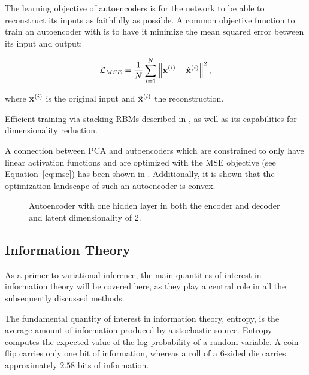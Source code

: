 The learning objective of autoencoders is for the network to be able to reconstruct its inputs as faithfully as possible. A common objective function to train an autoencoder with is to have it minimize the mean squared error between its input and output:

\begin{equation}
  \mathcal{L}_{MSE} = \frac{1}{N} \sum_{i=1}^{N} \left\lVert\mathbf{x}^{(i)} - \hat{\mathbf{x}}^{(i)}\right\rVert^2,
  \label{eq:mse}
\end{equation}

where $\mathbf{x}^{(i)}$ is the original input and $\hat{\mathbf{x}}^{(i)}$ the reconstruction.

Efficient training via stacking RBMs described in \cite{hinton_autoencoder}, as well as its capabilities for dimensionality reduction.

A connection between PCA and autoencoders which are constrained to only have linear activation functions and are optimized with the MSE objective (see Equation~\ref{eq:mse}) has been shown in \cite{autoencoder_pca}. Additionally, it is shown that the optimization landscape of such an autoencoder is convex.


\begin{figure}[!htb]
  \centering
  \resizebox{\textwidth}{!}{\unskip}
  \caption{Autoencoder with one hidden layer in both the encoder and decoder and latent dimensionality of 2.}
  \label{fig:ae}
\end{figure}

\subsection{Information Theory}

As a primer to variational inference, the main quantities of interest in information theory will be covered here, as they play a central role in all the subsequently discussed methods.

The fundamental quantity of interest in information theory, entropy, is the average amount of information produced by a stochastic source.  Entropy computes the expected value of the log-probability of a random variable. A coin flip carries only one bit of information, whereas a roll of a 6-sided die carries approximately $2.58$ bits of information.

